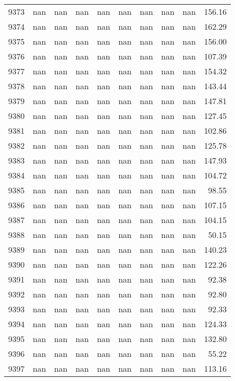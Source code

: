 \begin{tabular}{lrrrrrrrrr}
9373 & nan & nan & nan & nan & nan & nan & nan & nan & 156.16 \\
9374 & nan & nan & nan & nan & nan & nan & nan & nan & 162.29 \\
9375 & nan & nan & nan & nan & nan & nan & nan & nan & 156.00 \\
9376 & nan & nan & nan & nan & nan & nan & nan & nan & 107.39 \\
9377 & nan & nan & nan & nan & nan & nan & nan & nan & 154.32 \\
9378 & nan & nan & nan & nan & nan & nan & nan & nan & 143.44 \\
9379 & nan & nan & nan & nan & nan & nan & nan & nan & 147.81 \\
9380 & nan & nan & nan & nan & nan & nan & nan & nan & 127.45 \\
9381 & nan & nan & nan & nan & nan & nan & nan & nan & 102.86 \\
9382 & nan & nan & nan & nan & nan & nan & nan & nan & 125.78 \\
9383 & nan & nan & nan & nan & nan & nan & nan & nan & 147.93 \\
9384 & nan & nan & nan & nan & nan & nan & nan & nan & 104.72 \\
9385 & nan & nan & nan & nan & nan & nan & nan & nan & 98.55 \\
9386 & nan & nan & nan & nan & nan & nan & nan & nan & 107.15 \\
9387 & nan & nan & nan & nan & nan & nan & nan & nan & 104.15 \\
9388 & nan & nan & nan & nan & nan & nan & nan & nan & 50.15 \\
9389 & nan & nan & nan & nan & nan & nan & nan & nan & 140.23 \\
9390 & nan & nan & nan & nan & nan & nan & nan & nan & 122.26 \\
9391 & nan & nan & nan & nan & nan & nan & nan & nan & 92.38 \\
9392 & nan & nan & nan & nan & nan & nan & nan & nan & 92.80 \\
9393 & nan & nan & nan & nan & nan & nan & nan & nan & 92.33 \\
9394 & nan & nan & nan & nan & nan & nan & nan & nan & 124.33 \\
9395 & nan & nan & nan & nan & nan & nan & nan & nan & 132.80 \\
9396 & nan & nan & nan & nan & nan & nan & nan & nan & 55.22 \\
9397 & nan & nan & nan & nan & nan & nan & nan & nan & 113.16 \\

\end{tabular}
